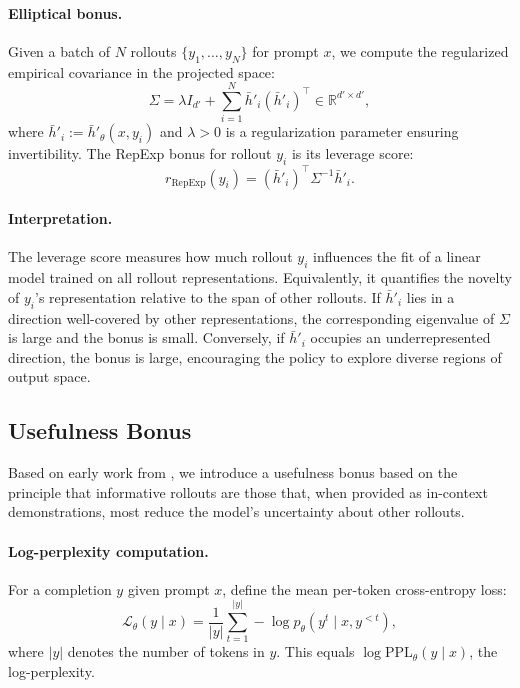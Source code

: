 \documentclass{article}
\theoremstyle{plain}
\theoremstyle{definition}
\theoremstyle{remark}
\begin{document}
\paragraph{Elliptical bonus.} Given a batch of $N$ rollouts $\{y_1, \ldots, y_N\}$ for prompt $x$, we compute the regularized empirical covariance in the projected space:
\begin{equation}
\Sigma = \lambda I_{d'} + \sum_{i=1}^{N} \bar{h}'_i (\bar{h}'_i)^\top \in \mathbb{R}^{d' \times d'},
\end{equation}
where $\bar{h}'_i := \bar{h}'_\theta(x, y_i)$ and $\lambda > 0$ is a regularization parameter ensuring invertibility. The RepExp bonus for rollout $y_i$ is its leverage score:
\begin{equation}
r_{\text{RepExp}}(y_i) = (\bar{h}'_i)^\top \Sigma^{-1} \bar{h}'_i.
\end{equation}

\paragraph{Interpretation.} The leverage score measures how much rollout $y_i$ influences the fit of a linear model trained on all rollout representations. Equivalently, it quantifies the novelty of $y_i$'s representation relative to the span of other rollouts. If $\bar{h}'_i$ lies in a direction well-covered by other representations, the corresponding eigenvalue of $\Sigma$ is large and the bonus is small. Conversely, if $\bar{h}'_i$ occupies an underrepresented direction, the bonus is large, encouraging the policy to explore diverse regions of output space.

\subsection{Usefulness Bonus}

Based on early work from \cite{schmidhuber2010formal}, we introduce a usefulness bonus based on the principle that informative rollouts are those that, when provided as in-context demonstrations, most reduce the model's uncertainty about other rollouts.

\paragraph{Log-perplexity computation.} For a completion $y$ given prompt $x$, define the mean per-token cross-entropy loss:
\begin{equation}
\mathcal{L}_\theta(y \mid x) = \frac{1}{|y|} \sum_{t=1}^{|y|} -\log p_\theta(y^t \mid x, y^{<t}),
\end{equation}
where $|y|$ denotes the number of tokens in $y$. This equals $\log \text{PPL}_\theta(y \mid x)$, the log-perplexity.
\end{document}
